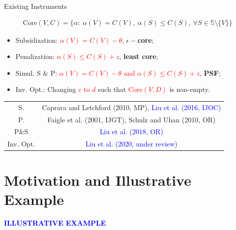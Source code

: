 \documentclass[14pt]{beamer}
\begin{document}
\begin{frame}{Existing Instruments}
\begin{small}
\vspace{-5mm}
\begin{eqnarray*}
\mathrm{Core}(V,C) = \bigg\{ \alpha:~ \alpha(V)=C(V),  ~\alpha(S) \leq C(S), ~\forall S \in \mathbb{S} \setminus \{V\}  \bigg\}
\end{eqnarray*}
\end{small}
\begin{itemize}
\small
\pause
\item Subsidization: \textcolor{red}{$\alpha(V)=C(V)-\theta$}, \textbf{$\epsilon-$core};
\pause
\item Penalization: \textcolor{red}{$\alpha(S) \leq C(S)+z$}, \textbf{least core};
\pause
\item Simul. S \& P: \textcolor{red}{$\alpha(V)=C(V)-\theta$ and $\alpha(S) \leq C(S)+z$}, \textbf{PSF};
\pause
\item Inv. Opt.: Changing \textcolor{red}{$c$ to $d$} such that \textcolor{red}{$\mathrm{Core}(V,D)$} is non-empty.
\end{itemize}
\pause
\vspace{-3mm}
\begin{table}[t]
	\small
	\centering
	\tabcolsep=1pt
	\renewcommand\arraystretch{1.8}
	\vspace{-3mm}
	\begin{tabular}[!h]{c c}
		\hline
		S.	&Caprara and Letchford (2010, MP), \textcolor{blue}{Liu et al. (2016, IJOC)}\\
		P.	&Faigle et al. (2001, IJGT), Schulz and Uhan (2010, OR)\\
		P\&S	&\textcolor{blue}{Liu et al. (2018, OR)}\\
		Inv. Opt.	&\textcolor{blue}{Liu et al. (2020, under review)}\\
		\hline
	\end{tabular}
	\vspace{-3mm}
\end{table}
\end{frame}

\section{Motivation and Illustrative Example}
\begin{frame}
\centering
\large
\textcolor{blue}{\bf {\huge I}LLUSTRATIVE  {\huge E}XAMPLE}
\end{frame}
\end{document}
